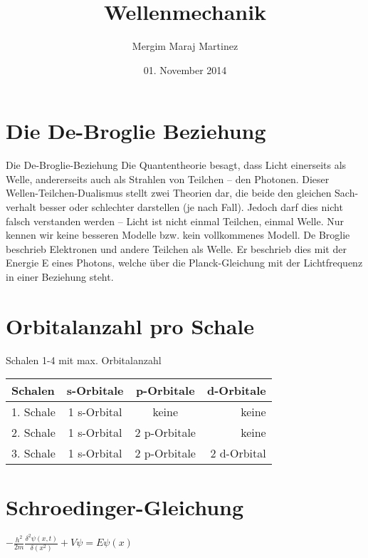 \documentclass{article}
\author{Mergim Maraj Martinez}
\title{Wellenmechanik}
\date{01. November 2014}
\begin{document}
\maketitle

\section{Die De-Broglie Beziehung}
Die De-Broglie-Beziehung
Die Quantentheorie besagt, dass Licht einerseits als Welle, andererseits auch als Strahlen von Teilchen – den Photonen. Dieser Wellen-Teilchen-Dualismus stellt zwei Theorien dar, die beide den gleichen Sach-verhalt besser oder schlechter darstellen (je nach Fall). Jedoch darf dies nicht falsch verstanden werden – Licht ist nicht einmal Teilchen, einmal Welle. Nur kennen wir keine besseren Modelle bzw. kein vollkommenes Modell. De Broglie beschrieb Elektronen und andere Teilchen als Welle. Er beschrieb dies mit der Energie E eines Photons, welche über die Planck-Gleichung mit der Lichtfrequenz in einer Beziehung steht.

\section{Orbitalanzahl pro Schale}
Schalen 1-4 mit max. Orbitalanzahl
\begin{center}
\begin{tabular}{l|c|c|r}
Schalen & s-Orbitale & p-Orbitale & d-Orbitale\\
\hline
1. Schale & 1 s-Orbital & keine & keine \\
2. Schale & 1 s-Orbital & 2 p-Orbitale & keine\\
3. Schale & 1 s-Orbital & 2 p-Orbitale & 2 d-Orbital\\
\end{tabular}
\end{center}
\section{Schroedinger-Gleichung}
\begin{center}
$-\frac{h^{2}}{2m}\frac{\delta^{2}\psi(x,t)}{\delta(x^{2})}+V\psi=E\psi(x)$
\end{center}
\end{document}
